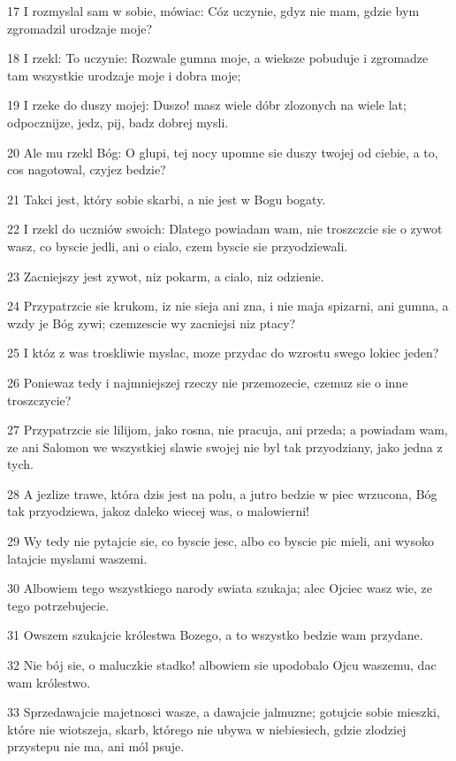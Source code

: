 \par 17 I rozmyslal sam w sobie, mówiac: Cóz uczynie, gdyz nie mam, gdzie bym zgromadzil urodzaje moje?
\par 18 I rzekl: To uczynie: Rozwale gumna moje, a wieksze pobuduje i zgromadze tam wszystkie urodzaje moje i dobra moje;
\par 19 I rzeke do duszy mojej: Duszo! masz wiele dóbr zlozonych na wiele lat; odpocznijze, jedz, pij, badz dobrej mysli.
\par 20 Ale mu rzekl Bóg: O glupi, tej nocy upomne sie duszy twojej od ciebie, a to, cos nagotowal, czyjez bedzie?
\par 21 Takci jest, który sobie skarbi, a nie jest w Bogu bogaty.
\par 22 I rzekl do uczniów swoich: Dlatego powiadam wam, nie troszczcie sie o zywot wasz, co byscie jedli, ani o cialo, czem byscie sie przyodziewali.
\par 23 Zacniejszy jest zywot, niz pokarm, a cialo, niz odzienie.
\par 24 Przypatrzcie sie krukom, iz nie sieja ani zna, i nie maja spizarni, ani gumna, a wzdy je Bóg zywi; czemzescie wy zacniejsi niz ptacy?
\par 25 I któz z was troskliwie myslac, moze przydac do wzrostu swego lokiec jeden?
\par 26 Poniewaz tedy i najmniejszej rzeczy nie przemozecie, czemuz sie o inne troszczycie?
\par 27 Przypatrzcie sie lilijom, jako rosna, nie pracuja, ani przeda; a powiadam wam, ze ani Salomon we wszystkiej slawie swojej nie byl tak przyodziany, jako jedna z tych.
\par 28 A jezlize trawe, która dzis jest na polu, a jutro bedzie w piec wrzucona, Bóg tak przyodziewa, jakoz daleko wiecej was, o malowierni!
\par 29 Wy tedy nie pytajcie sie, co byscie jesc, albo co byscie pic mieli, ani wysoko latajcie myslami waszemi.
\par 30 Albowiem tego wszystkiego narody swiata szukaja; alec Ojciec wasz wie, ze tego potrzebujecie.
\par 31 Owszem szukajcie królestwa Bozego, a to wszystko bedzie wam przydane.
\par 32 Nie bój sie, o maluczkie stadko! albowiem sie upodobalo Ojcu waszemu, dac wam królestwo.
\par 33 Sprzedawajcie majetnosci wasze, a dawajcie jalmuzne; gotujcie sobie mieszki, które nie wiotszeja, skarb, którego nie ubywa w niebiesiech, gdzie zlodziej przystepu nie ma, ani mól psuje.
